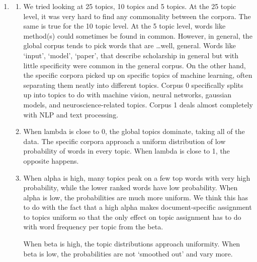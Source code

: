 \documentclass[12pt, letterpaper]{article}
\begin{document}
\begin{enumerate}[1.]
   \item
      \begin{enumerate}
          \item 
              We tried looking at 25 topics, 10 topics and 5 topics. At the 25 topic level, it was very hard to find any commonality between the corpora. The same is true for the 10 topic level. At the 5 topic level, words like method(s) could sometimes be found in common. However, in general, the global corpus tends to pick words that are \ldots well, general. Words like `input', `model', `paper', that describe scholarship in general but with little specificity were common in the general corpus. On the other hand, the specific corpora picked up on specific topics of machine learning, often separating them neatly into different topics. Corpus 0 specifically splits up into topics to do with machine vision, neural networks, gaussian models, and neuroscience-related topics. Corpus 1 deals almost completely with NLP and text processing. 
              
          \item
              When lambda is close to 0, the global topics dominate, taking all of the data. The specific corpora approach a uniform distribution of low probability of words in every topic. When lambda is close to 1, the opposite happens.

          \item
              When alpha is high, many topics peak on a few top words with very high probability, while the lower ranked words have low probability. When alpha is low, the probabilities are much more uniform. We think this has to do with the fact that a high alpha makes document-specific assignment to topics uniform so that the only effect on topic assignment has to do with word frequency per topic from the beta.

              When beta is high, the topic distributions approach uniformity. When beta is low, the probabilities are not `smoothed out' and vary more.
      \end{enumerate}

\end{enumerate}
\end{document}
